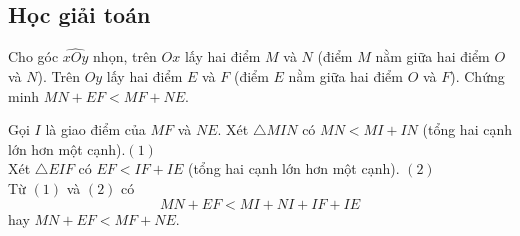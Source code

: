 \subsection{Học giải toán}
\begin{vd}%
Cho góc $\widehat{xOy}$ nhọn, trên $Ox$ lấy hai điểm $M$ và $N$ (điểm $M$ nằm giữa hai điểm $O$ và $N$). Trên $Oy$ lấy hai điểm $E$ và $F$ (điểm $E$ nằm giữa hai điểm $O$ và $F$). Chứng minh $MN+EF<MF+NE$.
\loigiai
{
	
\begin{minipage}{.5\textwidth}
Gọi $I$ là giao điểm của $MF$ và $NE$. Xét $\triangle MIN$ có $MN<MI+IN$ (tổng hai cạnh lớn hơn một cạnh).\hfill $(1)$\\
Xét $\triangle EIF$ có $EF<IF+IE$ (tổng hai cạnh lớn hơn một cạnh). \hfill $(2)$\\
Từ $(1)$ và $(2)$ có $$MN+EF<MI+NI+IF+IE$$
hay $MN+EF<MF+NE$.
\end{minipage}
\begin{minipage}{.5\textwidth}
\end{minipage}

}
\end{vd}
